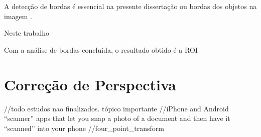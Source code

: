 A detecção de bordas é essencial na presente dissertação %
ou bordas dos objetos na imagem \cite{ISRAEL2003}. 

Neste trabalho %

Com a análise de bordas concluída, o resultado obtido é a ROI %



\section{Correção de Perspectiva}

//todo estudos nao finalizados. tópico importante
//iPhone and Android “scanner” apps that let you snap a photo of a document and then have it “scanned” into your phone
//four_point_transform


